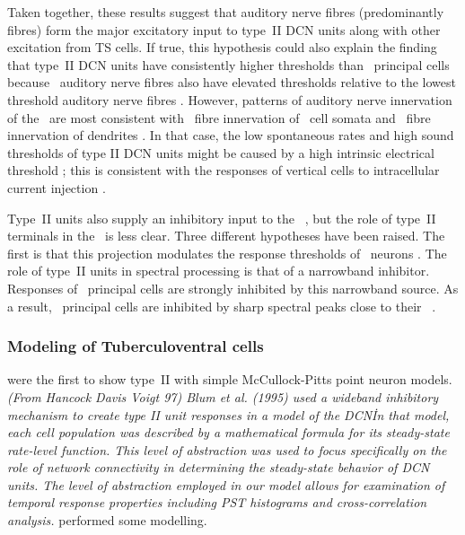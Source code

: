 

Taken together, these results suggest that auditory nerve fibres (predominantly \LSR fibres) form the major excitatory input to type~II DCN units along with other excitation from TS cells.
If true, this hypothesis could also explain the finding that type~II DCN units have consistently higher thresholds than \DCN~principal cells \citep{YoungBrownell:1976} because \LSR~auditory nerve fibres also have elevated thresholds relative to the lowest threshold auditory nerve fibres \citep{Liberman:1978}.
However, patterns of auditory nerve innervation of the \DCN~are most consistent with \HSR~fibre innervation of \TV~cell somata and \LSR~fibre innervation of dendrites \citep{Liberman:1993}.
In that case, the low spontaneous rates and high sound thresholds of type II DCN units might be caused by a high intrinsic electrical threshold \citep{HancockDavisEtAl:1997}; this is consistent with the responses of vertical cells to intracellular current injection \citep{DingVoigt:1997,ZhangOertel:1993b}.


Type~II units also supply an inhibitory input to the \VCN~\citep{WickesbergOertel:1990}, but the role of type~II terminals in the \VCN~is less clear.
Three different hypotheses have been raised.
The first is that this projection modulates the response thresholds of \VCN~neurons \citep{PaoliniClark:1998}.
The role of type~II units in spectral processing is that of a narrowband inhibitor. Responses of \DCN~principal cells are strongly inhibited by this narrowband source.
As a result, \DCN~principal cells are inhibited by sharp spectral peaks close to their \BF~\citep{SpirouDavisEtAl:1999}.



\subsubsection{Modeling of Tuberculoventral cells}

\citet{ArleKim:1991a} were the first to show type~II \EIRA  with simple McCullock-Pitts point neuron models.
\textit{(From Hancock Davis Voigt 97) Blum et al. (1995) used a wideband inhibitory   mechanism to create type II unit responses in a model of the DCN\. In that   model, each cell population was described by a mathematical formula for its   steady-state rate-level function. This level of abstraction was used to focus   specifically on the role of network connectivity in determining the   steady-state behavior of DCN units. The level of abstraction employed in our   model allows for examination of temporal response properties including PST   histograms and cross-correlation analysis.}
\citep{DunnVetterEtAl:1996} performed some modelling.


